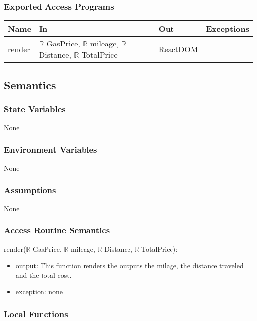 \documentclass[12pt, titlepage]{article}
\begin{document}
\subsubsection{Exported Access Programs}

\begin{tabular}{| l | l | l | l |}
  \hline
  \textbf{Name} & \textbf{In} & \textbf{Out} & \textbf{Exceptions}\\
  \hline
  render & $\mathbb{R}$ GasPrice, $\mathbb{R}$ mileage, $\mathbb{R}$ Distance, $\mathbb{R}$ TotalPrice & ReactDOM & ~\\
  \hline
\end{tabular}


\subsection{Semantics}

\subsubsection{State Variables}

None

\subsubsection{Environment Variables}

None

\subsubsection{Assumptions}

None

\subsubsection{Access Routine Semantics}

\noindent render($\mathbb{R}$ GasPrice, $\mathbb{R}$ mileage, $\mathbb{R}$ Distance, $\mathbb{R}$ TotalPrice):
\begin{itemize}
\item output: This function renders the outputs the milage, the distance traveled and the total cost.
\item exception: none
\end{itemize}

\subsubsection{Local Functions}
\end{document}
